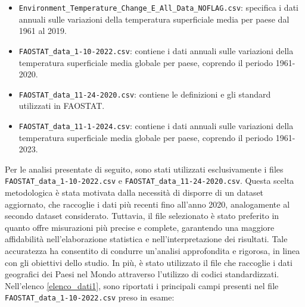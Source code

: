 \begin{itemize}
    \item\texttt{Environment\_Temperature\_Change\_E\_All\_Data\_NOFLAG.csv}: specifica i dati annuali sulle variazioni della temperatura superficiale media per paese dal 1961 al 2019.
    \item \texttt{FAOSTAT\_data\_1-10-2022.csv}: contiene i dati annuali sulle variazioni della temperatura superficiale media globale per paese, coprendo il periodo 1961-2020.
    \item \texttt{FAOSTAT\_data\_11-24-2020.csv}: contiene le definizioni e gli standard utilizzati in FAOSTAT.
    \item \texttt{FAOSTAT\_data\_11-1-2024.csv}: contiene i dati annuali sulle variazioni della temperatura superficiale media globale per paese, coprendo il periodo 1961-2023.
\end{itemize}
\vspace{2mm}
 Per le analisi presentate di seguito, sono stati utilizzati esclusivamente i files\\ \texttt{FAOSTAT\_data\_1-10-2022.csv} e \texttt{FAOSTAT\_data\_11-24-2020.csv}. Questa scelta metodologica è stata motivata dalla necessità di disporre di un dataset aggiornato, che raccoglie i dati più recenti fino all'anno 2020, analogamente al secondo dataset considerato. Tuttavia, il file selezionato è stato preferito in quanto offre misurazioni più precise e complete, garantendo una maggiore affidabilità nell'elaborazione statistica e nell'interpretazione dei risultati. Tale accuratezza ha consentito di condurre un'analisi approfondita e rigorosa, in linea con gli obiettivi dello studio. In più, è stato utilizzato il file che raccoglie i dati geografici dei Paesi nel Mondo attraverso l'utilizzo di codici standardizzati.
\\Nell'elenco \ref{elenco_dati1}, sono riportati i principali campi presenti nel file \texttt{FAOSTAT\_data\_1-10-2022.csv} preso in esame:
\vspace{2mm}
